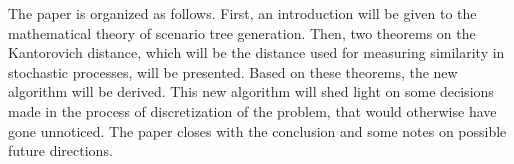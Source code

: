 \documentclass[12pt,onecolumn,headsepline,numbers=noenddot,bibliography=totoc,oneside,a4paper,fleqn,BCOR8mm] {scrartcl}
\begin{document}
The paper is organized as follows. First, an introduction will be given to the mathematical theory of scenario tree generation. Then, two theorems on the Kantorovich distance, which will be the distance used for measuring similarity in stochastic processes, will be presented. Based on these theorems, the new algorithm will be derived. This new algorithm will shed light on some decisions made in the process of discretization of the problem, that would otherwise have gone unnoticed. The paper closes with the conclusion and some notes on possible future directions.
\begin{comment}
\section{Stochastic Programming Theory}
Consider the following real world problem:

An operator in charge of a pumped hydro plant at any given time wants to make the optimal decision whether to pump water up into his reservoir with electrical power purchased at current spot market prices, do nothing, or release water from the reservoir and sell it at the spot market. 

For an introduction into the general theory see \cite{Birge1997}. For a more recent overview on optimization under uncertainty, see \cite{Sahinidis2004} and the references therein.

The generation of the scenario tree is a key step in the solution of stochastic programming problems.

In this paper we will present several ways to generate said scenario trees. The section is organized as follows. First, a short introduction to the basic mathematical theory will be given that is necessary to follow the derivations of the algorithms. Then, the state of the art in solving this problem is summarized. Finally, several new algorithms are derived. These new algorithms will differ from the ones proposed in the literature in that they attempt to solve the original problem to full optimality. The section will close with a discussion and comparison of the results of the presented algorithms.
\end{comment}

\end{document}
